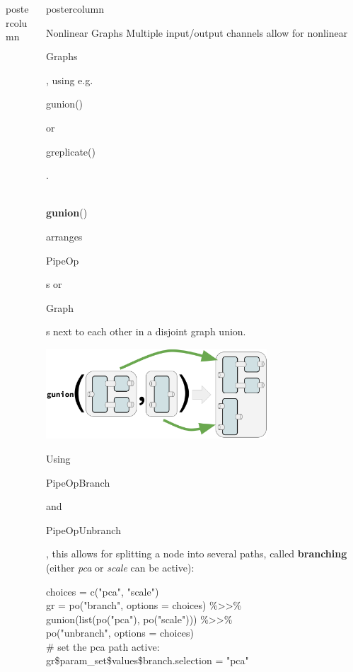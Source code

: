 \documentclass{beamer}
\newlength{\columnheight} %
\newcommand{\codeinline}[1]{\begin{codeboxinline}#1\end{codeboxinline}}
\begin{document}
\begin{frame}[fragile]{}
\begin{columns}
\begin{column}{.245\textwidth}
\begin{beamercolorbox}[center]{postercolumn}
			\end{beamercolorbox}
		\end{column}
    \begin{column}{.245\textwidth}
			\begin{beamercolorbox}[center]{postercolumn}
				\begin{minipage}{.98\textwidth}
					\parbox[t][\columnheight]{\textwidth}{
            \begin{myblock}{Nonlinear Graphs}
              \vspace{-0.5em}
              Multiple input/output channels allow for nonlinear \codeinline{Graphs}, using e.g. \codeinline{gunion()} or \codeinline{greplicate()}.\\
              \ \\
              \codeinline{\textbf{gunion}()} arranges \codeinline{PipeOp}s or \codeinline{Graph}s next to each other in a disjoint graph union.
              \begin{center}
                \includegraphics[width=0.7\textwidth]{img/gunion.pdf}
              \end{center}
               Using \codeinline{PipeOpBranch} and \codeinline{PipeOpUnbranch}, this allows for splitting a node into several paths, called \textbf{branching} (either \textit{pca} or \textit{scale} can be active):
              \vspace{0.3em}
              \begin{codeboxexample}
						    {\footnotesize
                  choices = c("pca", "scale")\\
                  gr = po("branch", options = choices) \%>{}>\%\\
                  \hspace*{1ex} gunion(list(po("pca"), po("scale"))) \%>{}>\%\\
                  \hspace*{1ex} po("unbranch", options = choices)\\
                  \# set the pca path active:\\
                  gr\$param\_set\$values\$branch.selection = "pca"}

\end{codeboxexample}
\end{myblock}}
\end{minipage}
\end{beamercolorbox}
\end{column}
\end{columns}
\end{frame}
\end{document}
